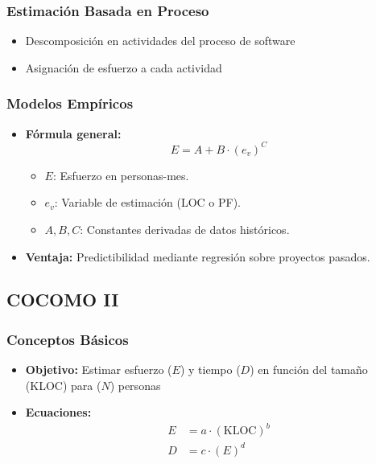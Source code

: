 \subsubsection{Estimación Basada en Proceso}

\begin{itemize}
    \item Descomposición en actividades del proceso de software
    \item Asignación de esfuerzo a cada actividad
\end{itemize}

\subsubsection{Modelos Empíricos}
\label{subsubsec:empiricos}

\begin{itemize}
    \item \textbf{Fórmula general:}
    \[
        E = A + B \cdot (e_v)^C
    \]
    \begin{itemize}
        \item $E$: Esfuerzo en personas-mes.
        \item $e_v$: Variable de estimación (LOC o PF).
        \item $A, B, C$: Constantes derivadas de datos históricos.
    \end{itemize}
    \item \textbf{Ventaja:} Predictibilidad mediante regresión sobre proyectos pasados.
\end{itemize}

\subsection{COCOMO II}
\label{subsec:cocomo}

\subsubsection{Conceptos Básicos}
\label{subsubsec:cocomo-basico}

\begin{itemize}
    \item \textbf{Objetivo:} Estimar esfuerzo ($E$) y tiempo ($D$) en función del tamaño (KLOC) para ($N$) personas
    \item \textbf{Ecuaciones:}
    \begin{align*}
        E &= a \cdot (\text{KLOC})^b \\
        D &= c \cdot (E)^d
    \end{align*}
\end{itemize}

